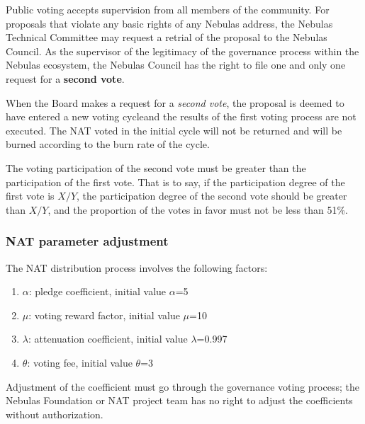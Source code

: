 Public voting accepts supervision from all members of the community. For proposals that violate any basic rights of any Nebulas address, the Nebulas Technical Committee may request a retrial of the proposal to the Nebulas Council. As the supervisor of the legitimacy of the governance process within the Nebulas ecosystem, the Nebulas Council has the right to file one and only one request for a \textbf{second vote}.

When the Board makes a request for a \emph{second vote}, the proposal is deemed to have entered a new voting cycleand the results of the first voting process are not executed. The NAT voted in the initial cycle will not be returned and will be burned according to the burn rate of the cycle.

The voting participation of the second vote must be greater than the
participation of the first vote. That is to say, if the participation degree of
the first vote is $X/Y$, the participation degree of the second vote should be
greater than $X/Y$, and the proportion of the votes in favor must not be less than 51\%.

\subsubsection{NAT parameter adjustment}

The NAT distribution process involves the following factors:

\begin{enumerate}
	\item $\alpha$: pledge coefficient, initial value $\alpha$=5
	\item $\mu$: voting reward factor, initial value $\mu$=10
	\item $\lambda$: attenuation coefficient, initial value $\lambda$=0.997
	\item $\theta$: voting fee, initial value $\theta$=3
\end{enumerate}

Adjustment of the coefficient must go through the governance voting process; the Nebulas Foundation or NAT project team has no right to adjust the coefficients without authorization.